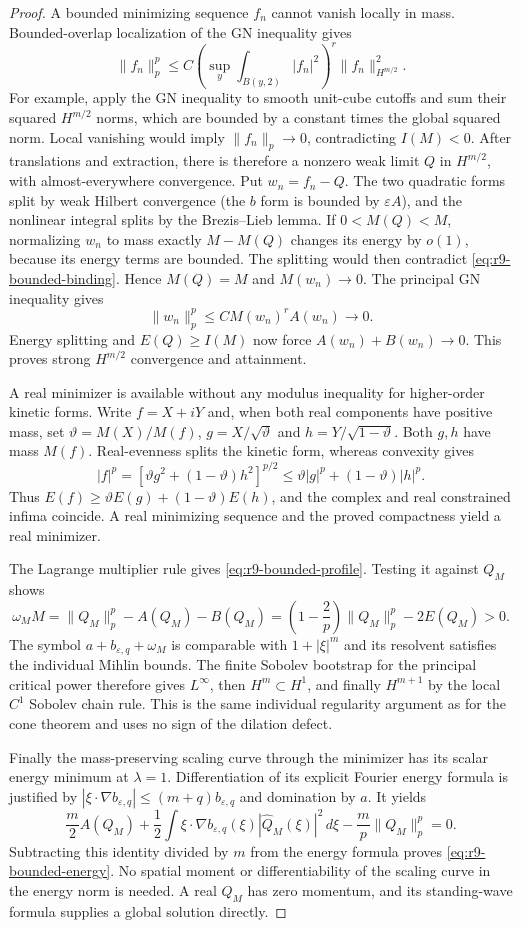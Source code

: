 \begin{proof}
A bounded minimizing sequence $f_n$ cannot vanish locally in mass.
Bounded-overlap localization of the GN inequality gives
\[
 \|f_n\|_p^p
 \le C\left(\sup_y\int_{B(y,2)}|f_n|^2\right)^r
           \|f_n\|_{H^{m/2}}^2.
\]
For example, apply the GN inequality to smooth unit-cube cutoffs and
sum their squared $H^{m/2}$ norms, which are bounded by a constant
times the global squared norm. Local vanishing would imply
$\|f_n\|_p\to0$, contradicting $I(M)<0$.
After translations and extraction, there is therefore a nonzero weak
limit $Q$ in $H^{m/2}$, with almost-everywhere convergence. Put
$w_n=f_n-Q$. The two quadratic forms split by weak Hilbert convergence
(the $b$ form is bounded by $\varepsilon A$), and the nonlinear
integral splits by the Brezis--Lieb lemma. If $0<M(Q)<M$, normalizing
$w_n$ to mass exactly $M-M(Q)$ changes its energy by $o(1)$, because
its energy terms are bounded. The splitting would then contradict
\eqref{eq:r9-bounded-binding}. Hence $M(Q)=M$ and $M(w_n)\to0$.
The principal GN inequality gives
\[
 \|w_n\|_p^p\le C M(w_n)^r A(w_n)\longrightarrow0.
\]
Energy splitting and $E(Q)\ge I(M)$ now force
$A(w_n)+B(w_n)\to0$. This proves strong $H^{m/2}$ convergence and
attainment.

A real minimizer is available without any modulus inequality for
higher-order kinetic forms. Write $f=X+iY$ and, when both real
components have positive mass, set
$\vartheta=M(X)/M(f)$, $g=X/\sqrt\vartheta$ and
$h=Y/\sqrt{1-\vartheta}$. Both $g,h$ have mass $M(f)$. Real-evenness
splits the kinetic form, whereas convexity gives
\[
 |f|^p=[\vartheta g^2+(1-\vartheta)h^2]^{p/2}
       \le\vartheta|g|^p+(1-\vartheta)|h|^p.
\]
Thus $E(f)\ge\vartheta E(g)+(1-\vartheta)E(h)$, and the complex
and real constrained infima coincide. A real minimizing sequence
and the proved compactness yield a real minimizer.

The Lagrange multiplier rule gives \eqref{eq:r9-bounded-profile}.
Testing it against $Q_M$ shows
\[
 \omega_M M=\|Q_M\|_p^p-A(Q_M)-B(Q_M)
       =\left(1-\frac2p\right)\|Q_M\|_p^p-2E(Q_M)>0.
\]
The symbol $a+b_{\varepsilon,q}+\omega_M$ is comparable with
$1+|\xi|^m$ and its resolvent satisfies the individual Mihlin bounds.
The finite Sobolev bootstrap for the principal critical power therefore
gives $L^\infty$, then $H^m\subset H^1$, and finally $H^{m+1}$ by
the local $C^1$ Sobolev chain rule. This is the same individual
regularity argument as for the cone theorem and uses no sign of the
dilation defect.

Finally the mass-preserving scaling curve through the minimizer has
its scalar energy minimum at $\lambda=1$. Differentiation of its
explicit Fourier energy formula is justified by
$|\xi\cdot\nabla b_{\varepsilon,q}|\le(m+q)b_{\varepsilon,q}$
and domination by $a$. It yields
\[
 \frac m2 A(Q_M)
 +\frac12\int\xi\cdot\nabla b_{\varepsilon,q}(\xi)
                         |\widehat Q_M(\xi)|^2\,d\xi
 -\frac mp\|Q_M\|_p^p=0.
\]
Subtracting this identity divided by $m$ from the energy formula
proves \eqref{eq:r9-bounded-energy}. No spatial moment or
differentiability of the scaling curve in the energy norm is needed.
A real $Q_M$ has zero momentum, and its standing-wave formula supplies
a global solution directly.
\end{proof}

